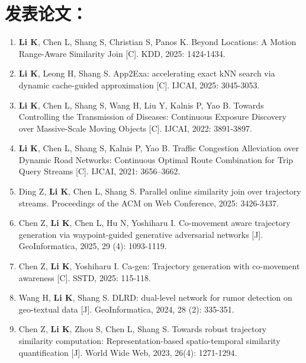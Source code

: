 \achievement %

	\section*{发表论文：}

	\begin{enumerate}
		\item \textbf{Li K}, Chen L, Shang S, Christian S, Panos K. Beyond Locations: A Motion Range-Aware Similarity Join [C]. KDD, 2025:  1424-1434.

		\item \textbf{Li K}, Leong H, Shang S. App2Exa: accelerating exact kNN search via dynamic cache-guided approximation [C]. IJCAI, 2025: 3045-3053.
		
		\item \textbf{Li K}, Chen L, Shang S, Wang H, Liu Y, Kalnis P, Yao B. Towards Controlling the Transmission of Diseases: Continuous Exposure Discovery over Massive-Scale Moving Objects [C]. IJCAI, 2022: 3891-3897.
		
		\item \textbf{Li K}, Chen L, Shang S, Kalnis P, Yao B. Traffic Congestion Alleviation over Dynamic Road Networks: Continuous Optimal Route Combination for Trip Query Streams [C]. IJCAI, 2021: 3656--3662.

		\item Ding Z, \textbf{Li K}, Chen L, Shang S. Parallel online similarity join over trajectory streams. Proceedings of the ACM on Web Conference, 2025: 3426-3437.

		\item Chen Z, \textbf{Li K}, Chen L, Hu N, Yoshiharu I. Co-movement aware trajectory generation via waypoint-guided generative adversarial networks [J]. GeoInformatica, 2025, 29 (4): 1093-1119.

		\item Chen Z, \textbf{Li K}, Yoshiharu I. Ca-gen: Trajectory generation with co-movement awareness [C]. SSTD, 2025: 115-118.

		\item Wang H, \textbf{Li K}, Shang S. DLRD: dual-level network for rumor detection on geo-textual data [J]. GeoInformatica, 2024, 28 (2): 335-351.

		\item Chen Z, \textbf{Li K}, Zhou S, Chen L, Shang S. Towards robust trajectory similarity computation: Representation-based spatio-temporal similarity quantification [J]. World Wide Web, 2023, 26(4): 1271-1294.


\end{enumerate}
